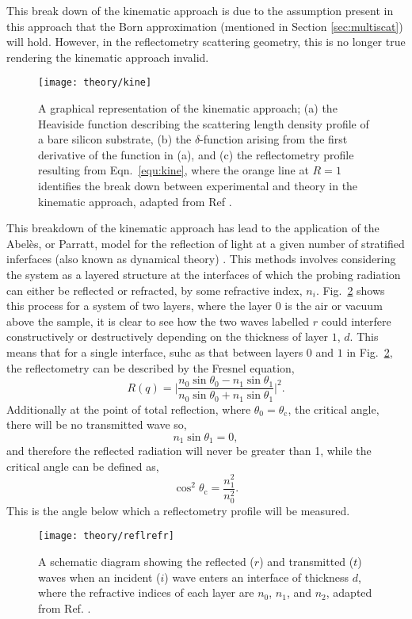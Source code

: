 This break down of the kinematic approach is due to the assumption present in this approach that the Born approximation (mentioned in Section \ref{sec:multiscat}) will hold.
However, in the reflectometry scattering geometry, this is no longer true rendering the kinematic approach invalid.
%
\begin{figure}
	\centering
	\texttt{[image: theory/kine]}
	\caption{A graphical representation of the kinematic approach; (a) the Heaviside function describing the scattering length density profile of a bare silicon substrate, (b) the $\delta$-function arising from the first derivative of the function in (a), and (c) the reflectometry profile resulting from Eqn.~\ref{equ:kine}, where the orange line at $R=1$ identifies the break down between experimental and theory in the kinematic approach, adapted from Ref \cite{Sivia2011}.}
	\label{fig:kine}
\end{figure}
%

This breakdown of the kinematic approach has lead to the application of the Abel\`{e}s, or Parratt, model for the reflection of light at a given number of stratified inferfaces (also known as dynamical theory) \cite{Abeles1948,Parratt1954}.
This methods involves considering the system as a layered structure at the interfaces of which the probing radiation can either be reflected or refracted, by some refractive index, $n_i$.
Fig.~\ref{fig:reflrefr} shows this process for a system of two layers, where the layer $0$ is the air or vacuum above the sample, it is clear to see how the two waves labelled $r$ could interfere constructively or destructively depending on the thickness of layer $1$, $d$.
This means that for a single interface, suhc as that between layers $0$ and $1$ in Fig.~\ref{fig:reflrefr}, the reflectometry can be described by the Fresnel equation,
%
\begin{equation}
	R(q) = \bigg| \frac{n_0\sin{\theta_0} - n_1\sin{\theta_1}}{n_0\sin{\theta_0} + n_1\sin{\theta_1}} \bigg|^2.
\end{equation}
%
Additionally at the point of total reflection, where $\theta_0 = \theta_{\text{c}}$, the critical angle, there will be no transmitted wave so,
%
\begin{equation}
	n_1\sin{\theta_1} = 0,
\end{equation}
%
and therefore the reflected radiation will never be greater than 1, while the critical angle can be defined as,
%
\begin{equation}
	\cos^2{\theta_{\text{c}}} = \frac{n_1^2}{n_0^2}.
\end{equation}
%
This is the angle below which a reflectometry profile will be measured.
%
\begin{figure}
	\centering
	\texttt{[image: theory/reflrefr]}
	\caption{A schematic diagram showing the reflected ($r$) and transmitted ($t$) waves when an incident ($i$) wave enters an interface of thickness $d$, where the refractive indices of each layer are $n_0$, $n_1$, and $n_2$, adapted from Ref. \cite{Foglia2015}.}
	\label{fig:reflrefr}
\end{figure}
%

